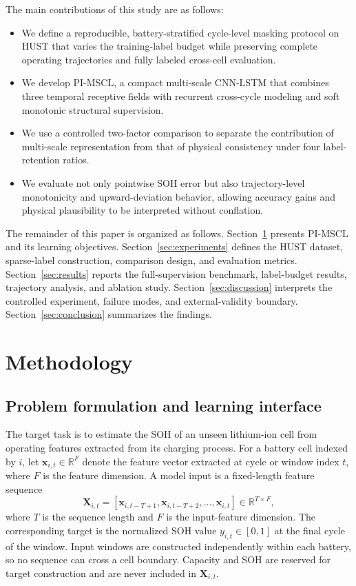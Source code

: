 \documentclass[pdflatex,sn-mathphys-num]{sn-jnl}
\begin{document}
The main contributions of this study are as follows:
\begin{itemize}
  \item We define a reproducible, battery-stratified cycle-level masking protocol on HUST that varies the training-label budget while preserving complete operating trajectories and fully labeled cross-cell evaluation.
  \item We develop PI-MSCL, a compact multi-scale CNN-LSTM that combines three temporal receptive fields with recurrent cross-cycle modeling and soft monotonic structural supervision.
  \item We use a controlled two-factor comparison to separate the contribution of multi-scale representation from that of physical consistency under four label-retention ratios.
  \item We evaluate not only pointwise SOH error but also trajectory-level monotonicity and upward-deviation behavior, allowing accuracy gains and physical plausibility to be interpreted without conflation.
\end{itemize}

The remainder of this paper is organized as follows. Section~\ref{sec:methodology} presents PI-MSCL and its learning objectives. Section~\ref{sec:experiments} defines the HUST dataset, sparse-label construction, comparison design, and evaluation metrics. Section~\ref{sec:results} reports the full-supervision benchmark, label-budget results, trajectory analysis, and ablation study. Section~\ref{sec:discussion} interprets the controlled experiment, failure modes, and external-validity boundary. Section~\ref{sec:conclusion} summarizes the findings.

\section{Methodology}
\label{sec:methodology}

\subsection{Problem formulation and learning interface}
\label{subsec:problem_formulation}

The target task is to estimate the SOH of an unseen lithium-ion cell from operating features extracted from its charging process. For a battery cell indexed by $i$, let $\mathbf{x}_{i,t}\in\mathbb{R}^{F}$ denote the feature vector extracted at cycle or window index $t$, where $F$ is the feature dimension. A model input is a fixed-length feature sequence
\begin{equation}
\mathbf{X}_{i,t}=\left[\mathbf{x}_{i,t-T+1},\mathbf{x}_{i,t-T+2},\ldots,\mathbf{x}_{i,t}\right]\in\mathbb{R}^{T\times F},
\label{eq:input_sequence}
\end{equation}
where $T$ is the sequence length and $F$ is the input-feature dimension. The corresponding target is the normalized SOH value $y_{i,t}\in[0,1]$ at the final cycle of the window. Input windows are constructed independently within each battery, so no sequence can cross a cell boundary. Capacity and SOH are reserved for target construction and are never included in $\mathbf{X}_{i,t}$.
\end{document}
